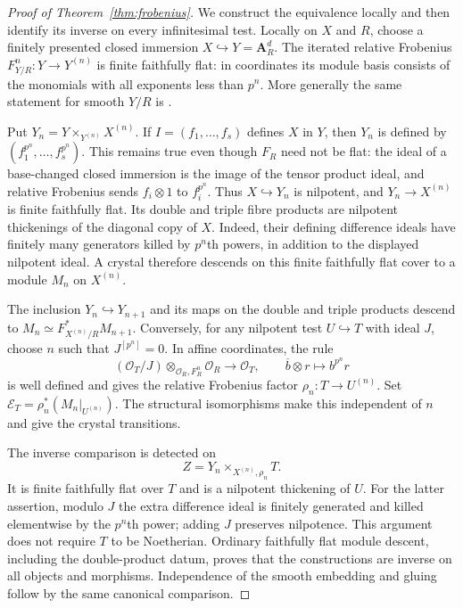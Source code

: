 \documentclass[11pt]{article}
\newcommand{\OO}{\mathcal O}\newcommand{\Fp}{\mathbf F_p}
\theoremstyle{definition}\newtheorem{definition}[theorem]{Definition}
\theoremstyle{remark}\newtheorem{remark}[theorem]{Remark}
\begin{document}
\begin{proof}[Proof of Theorem~\ref{thm:frobenius}]
We construct the equivalence locally and then identify its inverse on every infinitesimal test.  Locally on $X$ and $R$, choose a finitely presented closed immersion $X\hookrightarrow Y=\mathbf A_R^d$.  The iterated relative Frobenius $F_{Y/R}^n:Y\to Y^{(n)}$ is finite faithfully flat: in coordinates its module basis consists of the monomials with all exponents less than $p^n$.  More generally the same statement for smooth $Y/R$ is \cite[Lemma~50.19.5, Tag~0FW2]{StacksProject}.

Put $Y_n=Y\times_{Y^{(n)}}X^{(n)}$.  If $I=(f_1,\ldots,f_s)$ defines $X$ in $Y$, then $Y_n$ is defined by $(f_1^{p^n},\ldots,f_s^{p^n})$.  This remains true even though $F_R$ need not be flat: the ideal of a base-changed closed immersion is the image of the tensor product ideal, and relative Frobenius sends $f_i\otimes1$ to $f_i^{p^n}$.  Thus $X\hookrightarrow Y_n$ is nilpotent, and $Y_n\to X^{(n)}$ is finite faithfully flat.  Its double and triple fibre products are nilpotent thickenings of the diagonal copy of $X$.  Indeed, their defining difference ideals have finitely many generators killed by $p^n$th powers, in addition to the displayed nilpotent ideal.  A crystal therefore descends on this finite faithfully flat cover to a module $M_n$ on $X^{(n)}$.

The inclusion $Y_n\hookrightarrow Y_{n+1}$ and its maps on the double and triple products descend to $M_n\simeq F_{X^{(n)}/R}^*M_{n+1}$.  Conversely, for any nilpotent test $U\hookrightarrow T$ with ideal $J$, choose $n$ such that $J^{[p^n]}=0$.  In affine coordinates, the rule
\[
 (\OO_T/J)\otimes_{\OO_R,F_R^n}\OO_R
        \longrightarrow\OO_T,
       \qquad \overline b\otimes r\longmapsto b^{p^n}r
\]
is well defined and gives the relative Frobenius factor $\rho_n:T\to U^{(n)}$.  Set $\mathcal E_T=\rho_n^*(M_n|_{U^{(n)}})$.  The structural isomorphisms make this independent of $n$ and give the crystal transitions.

The inverse comparison is detected on
\[
                 Z=Y_n\times_{X^{(n)},\rho_n}T.
\]
It is finite faithfully flat over $T$ and is a nilpotent thickening of $U$.  For the latter assertion, modulo $J$ the extra difference ideal is finitely generated and killed elementwise by the $p^n$th power; adding $J$ preserves nilpotence.  This argument does not require $T$ to be Noetherian.  Ordinary faithfully flat module descent, including the double-product datum, proves that the constructions are inverse on all objects and morphisms.  Independence of the smooth embedding and gluing follow by the same canonical comparison.


\end{proof}
\end{document}
